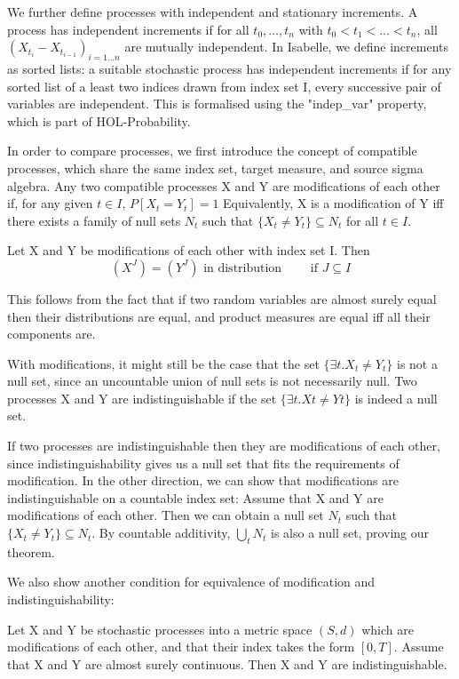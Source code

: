\documentclass[orivec, envcountsame]{llncs}
\begin{document}
We further define processes with independent and stationary increments. A process has independent increments if for all \(t_0,\dots,t_n\) with \(t_0 < t_1 < \dots < t_n\), all \((X_{t_i} - X_{t_{i-1}})_{i=1\dots n}\) are mutually independent. In Isabelle, we define increments as sorted lists: a suitable stochastic process has independent increments if for any sorted list of a least two indices drawn from index set I, every successive pair of variables are independent. This is formalised using  the "indep\_var" property, which is part of HOL-Probability.

In order to compare processes, we first introduce the concept of compatible processes, which share the same index set, target measure, and source sigma algebra. Any two compatible processes X and Y are modifications of each other if, for any given $t \in I$, $P[X_t = Y_t] = 1$ Equivalently, X is a modification of Y iff there exists a family of null sets $N_t$ such that $\{X_t \neq Y_t\} \subseteq N_t$ for all $t \in I$.

\begin{lemma}
Let X and Y be modifications of each other with index set I. Then \[(X^J) = (Y^J) \text{ in distribution}\qquad \text{ if } J \subseteq I\]
\end{lemma}
This follows from the fact that if two random variables are almost surely equal then their distributions are equal, and product measures are equal iff all their components are.

With modifications, it might still be the case that the set $\{\exists t. X_t \neq Y_t\}$ is not a null set, since an uncountable union of null sets is not necessarily null. Two processes X and Y are indistinguishable if the set $\{\exists t. X t \neq Y t\}$ is indeed a null set.

If two processes are indistinguishable then they are modifications of each other, since indistinguishability gives us a null set that fits the requirements of modification. In the other direction, we can show that modifications are indistinguishable on a countable index set: Assume that X and Y are modifications of each other. Then we can obtain a null set $N_t$ such that $\{X_t \neq Y_t\} \subseteq N_t$. By countable additivity, $\bigcup_t N_t$ is also a null set, proving our theorem.

We also show another condition for equivalence of modification and indistinguishability:

\begin{lemma}
Let X and Y be stochastic processes into a metric space \((S, d)\) which are modifications of each other, and that their index takes the form \([0,T]\). Assume that X and Y are almost surely continuous. Then X and Y are indistinguishable.
\end{lemma}
\end{document}
